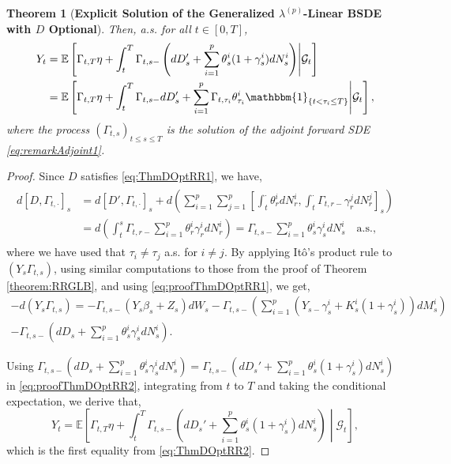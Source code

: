 \documentclass[11pt,a4paper]{article}
\numberwithin{equation}{section}
\theoremstyle{newPlain}
\newtheorem{theorem}{Theorem}[section]
\theoremstyle{newDefinition}
\theoremstyle{newRemark}
\begin{document}
{\begin{theorem}[\textbf{Explicit Solution of the Generalized $\lambda^{(p)}$-Linear BSDE with $D$ Optional}]
    Then, a.s. for all $t\in[0,T]$,
    \begin{align}\label{eq:ThmDOptRR2}
        \begin{aligned}
            Y_t &= \mathbb{E}\left[\Gamma_{t,T}\eta + \int_t^T\Gamma_{t,s-}\left(dD_s' + \sum_{i=1}^p\theta_s^i(1+\gamma_s^i)dN_s^i\right)\middle|\mathcal{G}_t\right]\\
            &=\mathbb{E}\left[\Gamma_{t,T}\eta+\int_t^T\Gamma_{t,s-}dD_s' + \sum_{i=1}^p\Gamma_{t,\tau_i}\theta_{\tau_i}^i\mathbbm{1}_{\{t < \tau_i \le T\}}\middle|\mathcal{G}_t\right],
        \end{aligned}
    \end{align}
    where the process $(\Gamma_{t,s})_{t\le s\le T}$ is the solution of  the adjoint forward SDE \eqref{eq:remarkAdjoint1}.
\end{theorem}
\begin{proof}
    Since $D$ satisfies \eqref{eq:ThmDOptRR1}, we have,
    \begin{align}\label{eq:proofThmDOptRR1}
        \begin{aligned}
            d[D,\Gamma_{t,\cdot}]_s &= d[D',\Gamma_{t,\cdot}]_s + d\left(\sum_{i=1}^p\sum_{j=1}^p\left[\int_t^\cdot\theta_r^idN_r^i, \int_t^\cdot\Gamma_{t,r-}\gamma_r^jdN_r^j\right]_s\right)\\
            &=d\left(\int_t^s\Gamma_{t,r-}\sum_{i=1}^p\theta_r^i\gamma_r^idN_r^i\right)=\Gamma_{t,s-}\sum_{i=1}^p\theta_s^i\gamma_s^idN_s^i\quad\text{a.s.},
        \end{aligned}
    \end{align}
    where we have used that $\tau_i\neq \tau_j$ a.s. for $i\neq j.$ 
     By applying It\^o's product rule to $(Y_s\Gamma_{t,s})$, using similar computations to those from the proof of Theorem \ref{theorem:RRGLB}, and using \eqref{eq:proofThmDOptRR1}, we get,
    \begin{multline}\label{eq:proofThmDOptRR2}
        -d(Y_s\Gamma_{t,s}) = -\Gamma_{t,s-}(Y_s\beta_s + Z_s)dW_s - \Gamma_{t,s-}\left(\sum_{i=1}^p(Y_{s-}\gamma_s^i + K_s^i(1+\gamma_s^i))dM_s^i\right)\\
        -\Gamma_{t,s-}\left(dD_s + \sum_{i=1}^p\theta_s^i\gamma_s^idN_s^i\right).
    \end{multline}

    Using $\Gamma_{t,s-}(dD_s + \sum_{i=1}^p\theta_s^i\gamma_s^idN_s^i) = \Gamma_{t,s-}(dD_s' + \sum_{i=1}^p\theta_s^i(1+\gamma_s^i)dN_s^i)$ in \eqref{eq:proofThmDOptRR2},  integrating from $t$ to $T$ and taking the conditional expectation, we derive that,
    \begin{equation}\label{eq:proofThmDOptRR3}
        Y_t = \mathbb{E}\left[\Gamma_{t,T}\eta + \int_t^T\Gamma_{t,s-}\left(dD_s' + \sum_{i=1}^p\theta_s^i(1+\gamma_s^i)dN_s^i\right)\middle|\mathcal{G}_t\right],
    \end{equation}
    which is the first equality from \eqref{eq:ThmDOptRR2}. 


\end{proof}}
\end{document}
